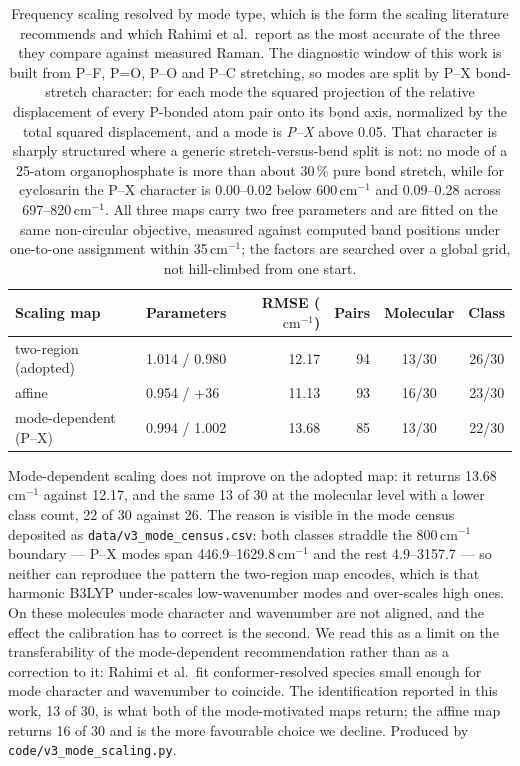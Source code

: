 \documentclass[11pt]{article}
\newcommand*\wn{\ensuremath{\text{cm}^{-1}}}
\begin{document}
\begin{table}[htbp]
\centering
\caption{Frequency scaling resolved by mode type, which is the form the scaling literature recommends and which Rahimi et al.\ report as the most accurate of the three they compare against measured Raman. The diagnostic window of this work is built from P--F, P=O, P--O and P--C stretching, so modes are split by P--X bond-stretch character: for each mode the squared projection of the relative displacement of every P-bonded atom pair onto its bond axis, normalized by the total squared displacement, and a mode is \emph{P--X} above 0.05. That character is sharply structured where a generic stretch-versus-bend split is not: no mode of a 25-atom organophosphate is more than about 30\,\% pure bond stretch, while for cyclosarin the P--X character is 0.00--0.02 below 600\,\wn{} and 0.09--0.28 across 697--820\,\wn{}. All three maps carry two free parameters and are fitted on the same non-circular objective, measured against computed band positions under one-to-one assignment within 35\,\wn{}; the factors are searched over a global grid, not hill-climbed from one start.}
\label{tab:si-modescale}
\small
\begin{tabular}{llrrcc}
\toprule
Scaling map & Parameters & RMSE (\wn{}) & Pairs & Molecular & Class \\
\midrule
two-region (adopted) & 1.014 / 0.980 & 12.17 & 94 & 13/30 & 26/30 \\
affine & 0.954 / +36 & 11.13 & 93 & 16/30 & 23/30 \\
mode-dependent (P--X) & 0.994 / 1.002 & 13.68 & 85 & 13/30 & 22/30 \\
\bottomrule
\end{tabular}

\begin{flushleft}\footnotesize Mode-dependent scaling does not improve on the adopted map: it returns 13.68\,\wn{} against 12.17, and the same 13 of 30 at the molecular level with a lower class count, 22 of 30 against 26. The reason is visible in the mode census deposited as \texttt{data/v3\_mode\_census.csv}: both classes straddle the 800\,\wn{} boundary --- P--X modes span 446.9--1629.8\,\wn{} and the rest 4.9--3157.7 --- so neither can reproduce the pattern the two-region map encodes, which is that harmonic B3LYP under-scales low-wavenumber modes and over-scales high ones. On these molecules mode character and wavenumber are not aligned, and the effect the calibration has to correct is the second. We read this as a limit on the transferability of the mode-dependent recommendation rather than as a correction to it: Rahimi et al.\ fit conformer-resolved species small enough for mode character and wavenumber to coincide. The identification reported in this work, 13 of 30, is what both of the mode-motivated maps return; the affine map returns 16 of 30 and is the more favourable choice we decline. Produced by \texttt{code/v3\_mode\_scaling.py}.\end{flushleft}
\end{table}
\end{document}
